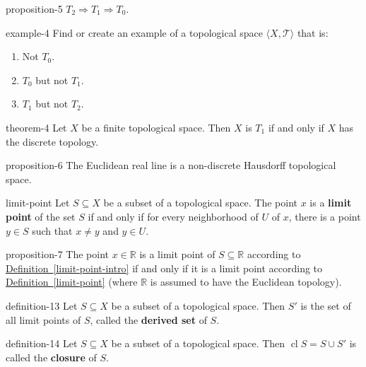 \documentclass[10pt,]{article}
\newcommand{\terminology}[1]{\textbf{#1}}
\newcommand{\tuple}[1]{\langle #1 \rangle}
\newcommand{\mb}{\mathbb}
\newcommand{\mc}{\mathcal}
\newcommand{\cl}{\operatorname{cl}}
\begin{document}
\begin{proposition}{}{}{proposition-5}%
\hypertarget{p-39}{}%
\(T_2\Rightarrow T_1\Rightarrow T_0\).%
\end{proposition}
\begin{example}{}{example-4}%
\hypertarget{p-40}{}%
Find or create an example of a topological space \(\tuple{X,\mc T}\) that is:%
\leavevmode%
\begin{enumerate}
\item\hypertarget{li-31}{}Not \(T_0\).%
\item\hypertarget{li-32}{}\(T_0\) but not \(T_1\).%
\item\hypertarget{li-33}{}\(T_1\) but not \(T_2\).%
\end{enumerate}
\end{example}
\begin{theorem}{}{}{theorem-4}%
\hypertarget{p-41}{}%
Let \(X\) be a finite topological space. Then \(X\) is \(T_1\) if and only if \(X\) has the discrete topology.%
\end{theorem}
\begin{proposition}{}{}{proposition-6}%
\hypertarget{p-42}{}%
The Euclidean real line is a non-discrete Hausdorff topological space.%
\end{proposition}
\begin{definition}{}{limit-point}%
\hypertarget{p-43}{}%
Let \(S\subseteq X\) be a subset of a topological space. The point \(x\) is a \terminology{limit point} of the set \(S\) if and only if for every neighborhood of \(U\) of \(x\), there is a point \(y\in S\) such that \(x\not=y\) and \(y\in U\).%
\end{definition}
\begin{proposition}{}{}{proposition-7}%
\hypertarget{p-44}{}%
The point \(x\in\mb R\) is a limit point of \(S\subseteq \mb R\) according to \hyperref[limit-point-intro]{Definition~\ref{limit-point-intro}} if and only if it is a limit point according to \hyperref[limit-point]{Definition~\ref{limit-point}} (where \(\mb R\) is assumed to have the Euclidean topology).%
\end{proposition}
\begin{definition}{}{definition-13}%
\hypertarget{p-45}{}%
Let \(S\subseteq X\) be a subset of a topological space. Then \(S'\) is the set of all limit points of \(S\), called the \terminology{derived set} of \(S\).%
\end{definition}
\begin{definition}{}{definition-14}%
\hypertarget{p-46}{}%
Let \(S\subseteq X\) be a subset of a topological space. Then \(\cl S=S\cup S'\) is called the \terminology{closure} of \(S\).%
\end{definition}
\end{document}
